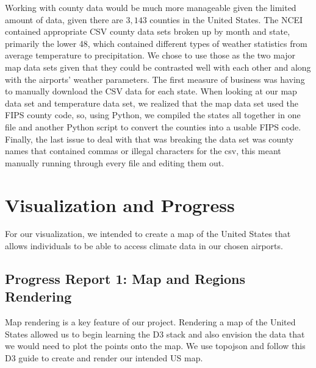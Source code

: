 \documentclass[10pt,twocolumn,twoside]{opticajnl}
\begin{document}
Working with county data would be much more manageable given the limited amount of data, given there are $3,143$ counties in the United States. The NCEI \cite{noaa_2019_national} contained appropriate CSV county data sets broken up by month and state, primarily the lower 48, which contained different types of weather statistics from average temperature to precipitation. We chose to use those as the two major map data sets given that they could be contrasted well with each other and along with the airports' weather parameters. The first measure of business was having to manually download the CSV data for each state. When looking at our map data set and temperature data set, we realized that the map data set used the FIPS county code, so, using Python, we compiled the states all together in one file and another Python script to convert the counties into a usable FIPS code. Finally, the last issue to deal with that was breaking the data set was county names that contained commas or illegal characters for the csv, this meant manually running through every file and editing them out.

\section {Visualization and Progress}

For our visualization, we intended to create a map of the United States that allows individuals to be able to access climate data in our chosen airports. 

\subsection{Progress Report 1: Map and Regions Rendering}

Map rendering is a key feature of our project. Rendering a map of the United States allowed us to begin learning the D3 stack and also envision the data that we would need to plot the points onto the map. We use topojson \cite{bostock_2024_topojsontopojson} and follow this D3 guide \cite{d3_2023_us} to create and render our intended US map.
\end{document}
